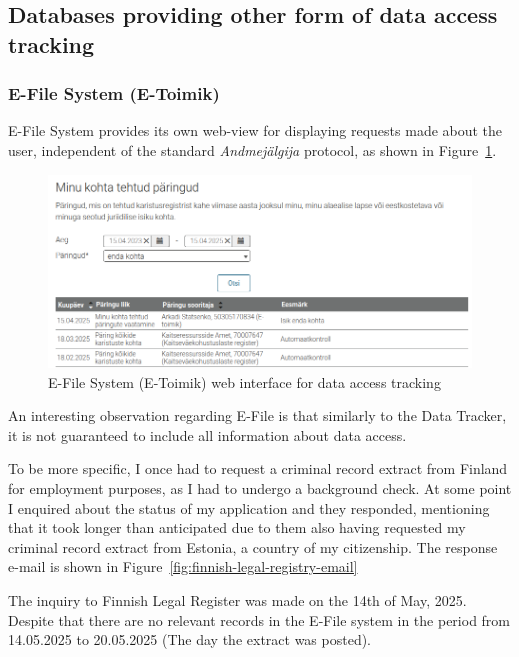 \subsection{Databases providing other form of data access tracking}

\subsubsection{E-File System (E-Toimik)}
E-File System provides its own web-view for displaying requests made about the user, independent of the standard \textit{Andmejälgija} protocol, as shown in Figure~\ref{fig:e-toimik}.

\begin{figure}[H]
\centering
\includegraphics[width=450px]{english/figures/e-toimik.png}
\caption{E-File System (E-Toimik) web interface for data access tracking\cite{e-toimik-screenshot}}
\label{fig:e-toimik}
\end{figure}

An interesting observation regarding E-File is that similarly to the Data Tracker, it is not guaranteed to include all information about data access.

To be more specific, I once had to request a criminal record extract from Finland for employment purposes, as I had to undergo a background check. At some point I enquired about the status of my application and they responded, mentioning that it took longer than anticipated due to them also having requested my criminal record extract from Estonia, a country of my citizenship. The response e-mail is shown in Figure~\ref{fig:finnish-legal-registry-email}

The inquiry to Finnish Legal Register was made on the 14th of May, 2025. Despite that there are no relevant records in the E-File system in the period from 14.05.2025 to 20.05.2025 (The day the extract was posted).

